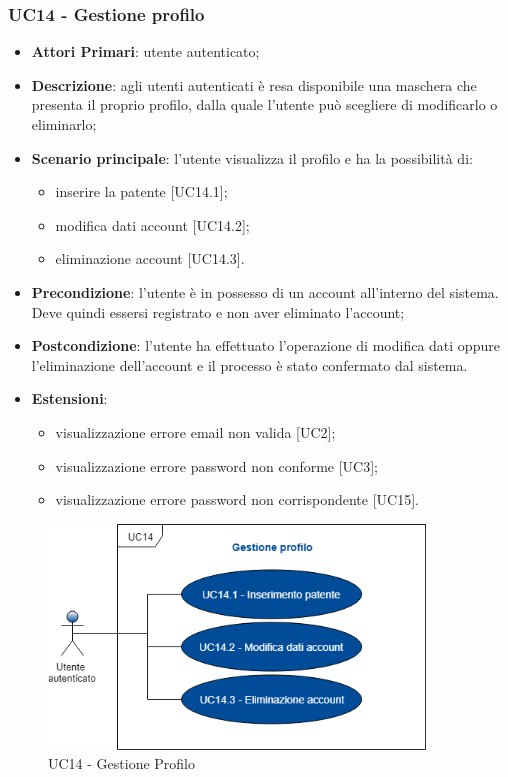 \subsubsection{UC14 - Gestione profilo}
\begin{itemize}
	\item \textbf{Attori Primari}: utente autenticato;
	\item \textbf{Descrizione}: agli utenti autenticati è resa disponibile una maschera che presenta il proprio profilo, dalla quale l'utente può scegliere di modificarlo o eliminarlo;
	\item \textbf{Scenario principale}: l'utente visualizza il profilo e ha la possibilità di: 
	\begin{itemize}
		\item inserire la patente [UC14.1];
		\item modifica dati account [UC14.2];
		\item eliminazione account [UC14.3].
	\end{itemize}
	\item \textbf{Precondizione}: l'utente è in possesso di un account all'interno del sistema. Deve quindi essersi registrato e non aver eliminato l'account;
	\item \textbf{Postcondizione}: l'utente ha effettuato l'operazione di modifica dati oppure l'eliminazione dell'account e il processo è stato confermato dal sistema.
	\item \textbf{Estensioni}:
	\begin{itemize}
		\item visualizzazione errore email non valida [UC2];
		\item visualizzazione errore password non conforme [UC3];
		\item visualizzazione errore password non corrispondente [UC15].
	\end{itemize}
\end{itemize}
\begin{figure}[h]
	\includegraphics[width=10cm]{res/images/UC14Profilo.png}
	\centering
	\caption{UC14 - Gestione Profilo}
\end{figure}
